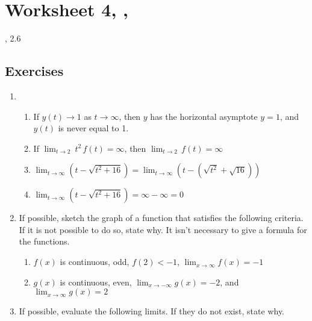 \newpage\section*{Worksheet 4, \Course, \Semester} 
\noindent {}, 2.6

\subsection*{Exercises}

\begin{enumerate}

    \item \TorF
    \begin{enumerate}
        \item If $y(t) \rightarrow 1$ as $t \rightarrow \infty$, then $y$ has the horizontal asymptote $y = 1$, and $y(t)$ is never equal to 1.      
    	\item {\large If $\displaystyle{\lim_{t\rightarrow 2}} \ t^2 \, f(t) = \infty$, then $\displaystyle{\lim_{t\rightarrow 2}} \, f(t) = \infty$ } 
        \item {\large $\displaystyle{\lim_{t\rightarrow \infty}} \left( t - \sqrt{t^2+16}\right) = \displaystyle{\lim_{t\rightarrow \infty}} \left( t - \left( \sqrt{t^2} + \sqrt{16}\right)\right) $ }
        \item {\large $\displaystyle{\lim_{t\rightarrow \infty}} \left( t - \sqrt{t^2+16}\right) = \infty - \infty = 0 $ }        
    \end{enumerate}
    
    \item If possible, sketch the graph of a function that satisfies the following criteria. If it is not possible to do so, state why. It isn't necessary to give a formula for the functions. 
	\begin{enumerate}
    	\item $f(x)$ is continuous, odd, $f(2) < -1$, $\displaystyle{\lim_{x\rightarrow\infty} f(x) = -1}$
    	\item $g(x)$ is continuous, even, $\displaystyle{\lim_{x\rightarrow-\infty} g(x) = -2}$, and $\displaystyle{\lim_{x\rightarrow \infty} g(x) =2}$        
    \end{enumerate}
	\item If possible, evaluate the following limits. If they do not exist, state why.

	\begin{enumerate}\setlength\itemsep{12pt}
    

\end{enumerate}
\end{enumerate}

